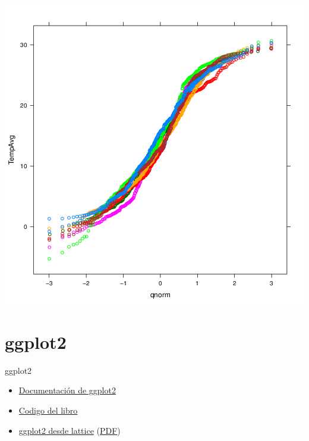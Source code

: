 \documentclass[xcolor={usenames,svgnames,dvipsnames}]{beamer}
\begin{document}
\begin{frame}[label={sec:orgheadline62}]{}
\includegraphics[width=.9\linewidth]{figs/qqNorm.png}
\end{frame}


\section{ggplot2}
\label{sec:orgheadline65}
\begin{frame}[label={sec:orgheadline64}]{ggplot2}
\begin{itemize}
\item \href{http://docs.ggplot2.org/current/}{Documentación de ggplot2}
\item \href{http://ggplot2.org/book/}{Codigo del libro}
\item \href{http://learnr.wordpress.com/2009/06/28/ggplot2-version-of-figures-in-lattice-multivariate-data-visualization-with-r-part-1/}{ggplot2 desde lattice} (\href{http://learnr.files.wordpress.com/2009/08/latbook.pdf}{PDF})
\end{itemize}
\end{frame}
\end{document}
